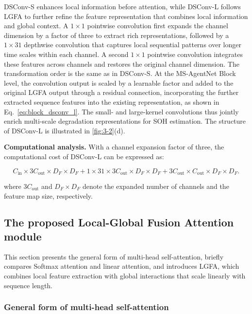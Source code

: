 DSConv-S enhances local information before attention, while DSConv-L follows LGFA to further refine the feature representation that combines local information and global context. A $1\times1$ pointwise convolution first expands the channel dimension by a factor of three to extract rich representations, followed by a $1\times31$ depthwise convolution that captures local sequential patterns over longer time scales within each channel. A second $1\times1$ pointwise convolution integrates these features across channels and restores the original channel dimension. The transformation order is the same as in DSConv-S. At the MS-AgentNet Block level, the convolution output is scaled by a learnable factor and added to the original LGFA output through a residual connection, incorporating the further extracted sequence features into the existing representation, as shown in Eq.~\eqref{eq:block_dsconv_l}. The small- and large-kernel convolutions thus jointly enrich multi-scale degradation representations for SOH estimation. The structure of DSConv-L is illustrated in \cref{fig:3-2}(d).

\textbf{Computational analysis.} With a channel expansion factor of three, the computational cost of DSConv-L can be expressed as:

\begin{equation}
C_{\mathrm{in}}\times3C_{\mathrm{out}}\times D_F\times D_F
+1\times31\times3C_{\mathrm{out}}\times D_F\times D_F
+3C_{\mathrm{out}}\times C_{\mathrm{out}}\times D_F\times D_F.
\label{eq:dsconv_l_expanded_cost}
\end{equation}

where $3C_{\mathrm{out}}$ and $D_F\times D_F$ denote the expanded number of channels and the feature map size, respectively.


\FloatBarrier

\subsection{The proposed Local-Global Fusion Attention module}

This section presents the general form of multi-head self-attention, briefly compares Softmax attention and linear attention, and introduces LGFA, which combines local feature extraction with global interactions that scale linearly with sequence length.


\subsubsection{General form of multi-head self-attention}

